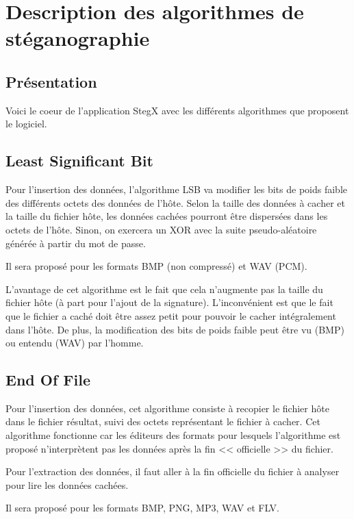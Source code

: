 \documentclass[11pt]{article}
\begin{document}
\section{Description des algorithmes de stéganographie}

\subsection{Présentation}

Voici le coeur de l'application StegX avec les différents algorithmes que 
proposent le logiciel. 

\subsection{Least Significant Bit}

Pour l'insertion des données, l'algorithme LSB va modifier les bits de 
poids faible des différents octets des données de l'hôte. Selon la taille des
données à cacher et la taille du fichier hôte, les données cachées pourront 
être dispersées dans les octets de l'hôte. Sinon, on exercera un XOR avec 
la suite pseudo-aléatoire générée à partir du mot de passe. 

Il sera proposé pour les formats BMP (non compressé) et WAV (PCM).

L'avantage de cet algorithme est le fait que cela n'augmente pas la 
taille du fichier hôte (à part pour l'ajout de la signature). 
L'inconvénient est que le fait que le fichier a caché doit être assez petit 
pour pouvoir le cacher intégralement dans l'hôte. De plus, la modification 
des bits de poids faible peut être vu (BMP) ou entendu (WAV) par l'homme. 

\subsection{End Of File}

Pour l'insertion des données, cet algorithme consiste à recopier le fichier 
hôte dans le fichier résultat, suivi des octets représentant le fichier 
à cacher. Cet algorithme fonctionne car les éditeurs 
des formats pour lesquels l'algorithme est proposé n'interprètent pas les 
données après la fin << officielle >> du fichier. 

Pour l'extraction des données, il faut aller à la fin officielle du fichier 
à analyser pour lire les données cachées. 

Il sera proposé pour les formats BMP, PNG, MP3, WAV et FLV.
\end{document}
